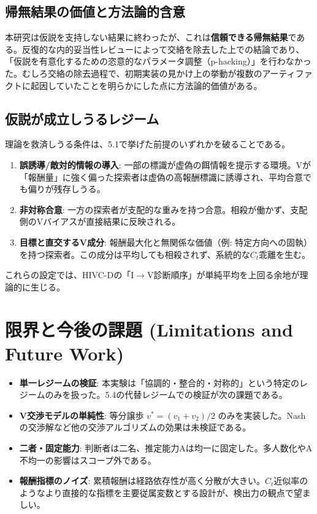 \documentclass[11pt]{ltjsarticle}
\newcommand{\Ct}{\ensuremath{C_t}}
\begin{document}
\subsection{帰無結果の価値と方法論的含意}

本研究は仮説を支持しない結果に終わったが、これは\textbf{信頼できる帰無結果}である。反復的な内的妥当性レビューによって交絡を除去した上での結論であり、「仮説を有意化するための恣意的なパラメータ調整（p-hacking）」を行わなかった。むしろ交絡の除去過程で、初期実装の見かけ上の挙動が複数のアーティファクトに起因していたことを明らかにした点に方法論的価値がある。

\subsection{仮説が成立しうるレジーム}

理論を救済しうる条件は、5.1で挙げた前提のいずれかを破ることである。

\begin{enumerate}[nosep]
  \item \textbf{誤誘導/敵対的情報の導入}: 一部の標識が虚偽の餌情報を提示する環境。Vが「報酬量」に強く偏った探索者は虚偽の高報酬標識に誘導され、平均合意でも偏りが残存しうる。
  \item \textbf{非対称合意}: 一方の探索者が支配的な重みを持つ合意。相殺が働かず、支配側のVバイアスが直接結果に反映される。
  \item \textbf{目標と直交するV成分}: 報酬最大化と無関係な価値（例: 特定方向への固執）を持つ探索者。この成分は平均しても相殺されず、系統的な\Ct{}乖離を生む。
\end{enumerate}

これらの設定では、HIVC-Dの「I$\to$V診断順序」が単純平均を上回る余地が理論的に生じる。

\section{限界と今後の課題 (Limitations and Future Work)}

\begin{itemize}[nosep]
  \item \textbf{単一レジームの検証}: 本実験は「協調的・整合的・対称的」という特定のレジームのみを扱った。5.4の代替レジームでの検証が次の課題である。
  \item \textbf{V交渉モデルの単純性}: 等分譲歩 $v^*=(v_1+v_2)/2$ のみを実装した。Nashの交渉解など他の交渉アルゴリズムの効果は未検証である。
  \item \textbf{二者・固定能力}: 判断者は二名、推定能力Aは均一に固定した。多人数化やA不均一の影響はスコープ外である。
  \item \textbf{報酬指標のノイズ}: 累積報酬は経路依存性が高く分散が大きい。\Ct{}近似率のようなより直接的な指標を主要従属変数とする設計が、検出力の観点で望ましい。
\end{itemize}
\end{document}
